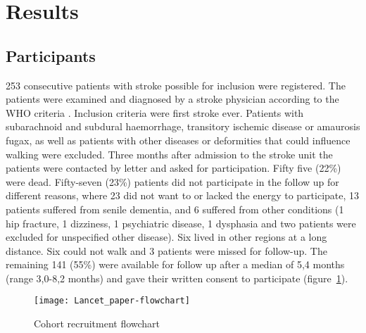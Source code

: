 \documentclass[a4paper,12pt]{article}
\begin{document}
\section{Results}
\subsection{Participants}
253 consecutive patients with stroke possible for inclusion were registered. The patients were examined and diagnosed by a stroke physician according to the WHO criteria \cite{Thorvaldsen1995}. Inclusion criteria were first stroke ever. Patients with subarachnoid and subdural haemorrhage, transitory ischemic disease or amaurosis fugax, as well as patients with other diseases or deformities that could influence walking were excluded. 
Three months after admission to the stroke unit the patients were contacted by letter and asked for participation. Fifty five (22\%) were dead. Fifty-seven (23\%) patients did not participate in the follow up for different reasons, where 23 did not want to or lacked the energy to participate, 13 patients suffered from senile dementia, and 6 suffered from other conditions (1 hip fracture, 1 dizziness, 1 psychiatric disease, 1 dysphasia and two patients were excluded for unspecified other disease). Six lived in other regions at a long distance. Six could not walk and 3 patients were missed for follow-up.
The remaining 141 (55\%) were available for follow up after a median of 5,4 months (range 3,0-8,2 months) and gave their written consent to participate (figure~\ref{fig:flowchart}). 
\begin{figure}[h]
\texttt{[image: Lancet\_paper-flowchart]}
\caption{Cohort recruitment flowchart}
\label{fig:flowchart}
\end{figure}
\end{document}
